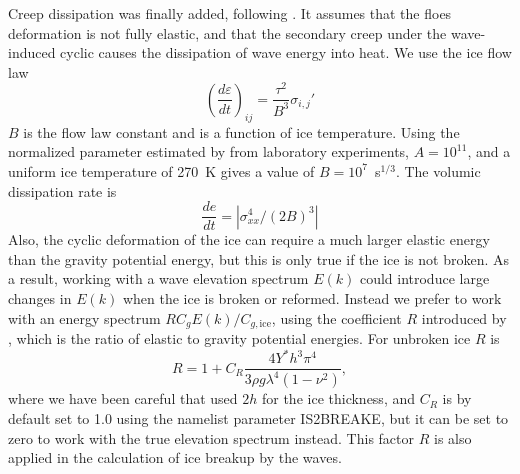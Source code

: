 \noindent
Creep dissipation was  finally added, following \cite{art:Wad73}.  It assumes that the floes deformation is not fully elastic, and that the secondary creep under the wave-induced cyclic causes the dissipation of wave energy into heat. 
We use the ice flow law
\begin{equation}
\left(\frac{d\varepsilon}{dt}\right)_{ij}=\frac{\tau^2}{B^3}\sigma_{i,j}'
\end{equation}
$B$ is the flow law  constant and is a function of ice temperature. Using the normalized parameter estimated by \cite{art:Cea98} from 
laboratory experiments, $A=10^{11}$,  and  a uniform ice temperature of 270~K  gives a value 
of $B=10^7$~s$^{1/3}$. The volumic dissipation rate is 
\begin{equation}
\frac{de}{dt}= | \sigma_{xx}^{4}/(2B)^3 |
\end{equation}
Also, the cyclic deformation of the ice can require a much larger elastic energy than the gravity potential 
energy, but this is only true if the ice is not broken. As a result, working with a wave elevation spectrum $E(k)$ 
could introduce large changes in $E(k)$ when the ice is broken or reformed. Instead we prefer 
to work with an energy spectrum $ R C_g E(k)/C_{g,\mathrm{ice}}$, using the coefficient $R$ introduced by \cite{art:Wad73}, which 
is the ratio of elastic to gravity potential energies. 
For unbroken ice  $R$ is 
\begin{equation}
R=1+C_R\frac{4Y^*h^3\pi^4}{3\rho g \lambda^4(1-\nu^2)},
\label{R}
\end{equation}
where we have been careful that \cite{art:Wad73} used $2h$ for the  ice thickness, 
and $C_R$ is by default set to 1.0 using the namelist parameter {\code IS2BREAKE}, but it can 
be set to zero to work with the true elevation spectrum instead. This factor $R$ is also 
applied in the calculation of ice breakup by the waves.\\

